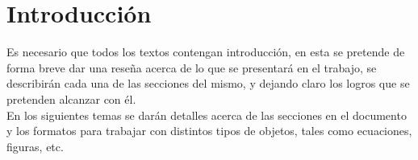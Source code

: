 \documentclass[
10pt,			%
letterpaper,	%
oneside,		%
headinclude, footinclude, %
BCOR5mm, 		%
]{scrartcl}
\begin{document}

\section{Introducción}  %
Es necesario que todos los textos contengan introducción, en esta se pretende de forma breve dar una reseña acerca de lo que se presentará en el trabajo, se describirán cada una de las secciones del mismo, y dejando claro los logros que se pretenden alcanzar con él.\\
En los siguientes temas se darán detalles acerca de las secciones en el documento y los formatos para trabajar con distintos tipos de objetos, tales como ecuaciones, figuras, etc.

\end{document}
